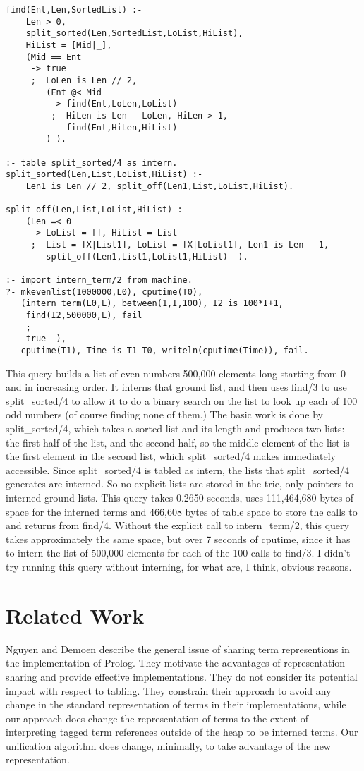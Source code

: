 \documentclass{llncs}
\begin{document}
\begin{verbatim}
find(Ent,Len,SortedList) :-  
    Len > 0,
    split_sorted(Len,SortedList,LoList,HiList),
    HiList = [Mid|_],
    (Mid == Ent
     -> true
     ;  LoLen is Len // 2,
        (Ent @< Mid
         -> find(Ent,LoLen,LoList)
         ;  HiLen is Len - LoLen, HiLen > 1,
            find(Ent,HiLen,HiList)
        ) ).

:- table split_sorted/4 as intern.
split_sorted(Len,List,LoList,HiList) :-
    Len1 is Len // 2, split_off(Len1,List,LoList,HiList).

split_off(Len,List,LoList,HiList) :-
    (Len =< 0
     -> LoList = [], HiList = List
     ;  List = [X|List1], LoList = [X|LoList1], Len1 is Len - 1,
        split_off(Len1,List1,LoList1,HiList)  ).

:- import intern_term/2 from machine.
?- mkevenlist(1000000,L0), cputime(T0),
   (intern_term(L0,L), between(1,I,100), I2 is 100*I+1,
    find(I2,500000,L), fail
    ;
    true  ),
   cputime(T1), Time is T1-T0, writeln(cputime(Time)), fail.
\end{verbatim}

This query builds a list of even numbers 500,000 elements long
starting from 0 and in increasing order.  It interns that ground list,
and then uses find/3 to use split\_sorted/4 to allow it to do a binary
search on the list to look up each of 100 odd numbers (of course
finding none of them.)  The basic work is done by split\_sorted/4,
which takes a sorted list and its length and produces two lists: the
first half of the list, and the second half, so the middle element of
the list is the first element in the second list, which split\_sorted/4
makes immediately accessible.  Since split\_sorted/4 is tabled as
intern, the lists that split\_sorted/4 generates are interned.  So no
explicit lists are stored in the trie, only pointers to interned
ground lists.  This query takes 0.2650 seconds, uses 111,464,680 bytes
of space for the interned terms and 466,608 bytes of table space to
store the calls to and returns from find/4.  Without the explicit call
to intern\_term/2, this query takes approximately the same space, but
over 7 seconds of cputime, since it has to intern the list of 500,000
elements for each of the 100 calls to find/3.  I didn't try running
this query without interning, for what are, I think, obvious reasons.


\section{Related Work}
Nguyen and Demoen \cite{nguyen-demoen-rep-sharing} describe the
general issue of sharing term representions in the implementation of
Prolog.  They motivate the advantages of representation sharing and
provide effective implementations.  They do not consider its potential
impact with respect to tabling.  They constrain their approach to
avoid any change in the standard representation of terms in their
implementations, while our approach does change the representation of
terms to the extent of interpreting tagged term references outside of
the heap to be interned terms.  Our unification algorithm does change,
minimally, to take advantage of the new representation.
\end{document}
